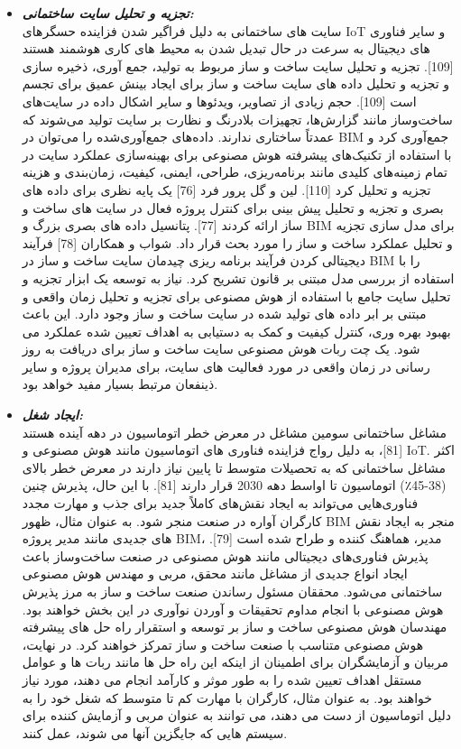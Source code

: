 \documentclass[towcolumn, 11pt]{Article}
\begin{document}
\begin{چکیده}
\begin{itemize}
\item
\textbf{\emph{تجزیه و تحلیل سایت ساختمانی:}}
\\سایت های ساختمانی به دلیل فراگیر شدن فزاینده حسگرهای IoT و سایر فناوری های دیجیتال به سرعت در حال تبدیل شدن به محیط های کاری هوشمند هستند [109]. تجزیه و تحلیل سایت ساخت و ساز مربوط به تولید، جمع آوری، ذخیره سازی و تجزیه و تحلیل داده های سایت ساخت و ساز برای ایجاد بینش عمیق برای تجسم است [109]. حجم زیادی از تصاویر، ویدئوها و سایر اشکال داده در سایت‌های ساخت‌وساز مانند گزارش‌ها، تجهیزات بلادرنگ و نظارت بر سایت تولید می‌شوند که عمدتاً ساختاری ندارند. داده‌های جمع‌آوری‌شده را می‌توان در BIM جمع‌آوری کرد و با استفاده از تکنیک‌های پیشرفته هوش مصنوعی برای بهینه‌سازی عملکرد سایت در تمام زمینه‌های کلیدی مانند برنامه‌ریزی، طراحی، ایمنی، کیفیت، زمان‌بندی و هزینه تجزیه و تحلیل کرد [110].
لین و گل پرور فرد [76] یک پایه نظری برای داده های بصری و تجزیه و تحلیل پیش بینی برای کنترل پروژه فعال در سایت های ساخت و ساز ارائه کردند [77]. پتانسیل داده های بصری بزرگ و BIM برای مدل سازی تجزیه و تحلیل عملکرد ساخت و ساز را مورد بحث قرار داد. شواب و همکاران [78] فرآیند دیجیتالی کردن فرآیند برنامه ریزی چیدمان سایت ساخت و ساز در BIM را با استفاده از بررسی مدل مبتنی بر قانون تشریح کرد. نیاز به توسعه یک ابزار تجزیه و تحلیل سایت جامع با استفاده از هوش مصنوعی برای تجزیه و تحلیل زمان واقعی و مبتنی بر ابر داده های تولید شده در سایت ساخت و ساز وجود دارد. این باعث بهبود بهره وری، کنترل کیفیت و کمک به دستیابی به اهداف تعیین شده عملکرد می شود. یک چت ربات هوش مصنوعی سایت ساخت و ساز برای دریافت به روز رسانی در زمان واقعی در مورد فعالیت های سایت، برای مدیران پروژه و سایر ذینفعان مرتبط بسیار مفید خواهد بود.

\item
\textbf{\emph{ایجاد شغل:}}
\\مشاغل ساختمانی سومین مشاغل در معرض خطر اتوماسیون در دهه آینده هستند [81]، به دلیل رواج فزاینده فناوری های اتوماسیون مانند هوش مصنوعی و IoT. اکثر مشاغل ساختمانی که به تحصیلات متوسط تا پایین نیاز دارند در معرض خطر بالای (38-45٪) اتوماسیون تا اواسط دهه 2030 قرار دارند [81]. با این حال، پذیرش چنین فناوری‌هایی می‌تواند به ایجاد نقش‌های کاملاً جدید برای جذب و مهارت مجدد کارگران آواره در صنعت منجر شود. به عنوان مثال، ظهور BIM منجر به ایجاد نقش های جدیدی مانند مدیر پروژه BIM، مدیر، هماهنگ کننده و طراح شده است [79]. پذیرش فناوری‌های دیجیتالی مانند هوش مصنوعی در صنعت ساخت‌وساز باعث ایجاد انواع جدیدی از مشاغل مانند محقق، مربی و مهندس هوش مصنوعی ساختمانی می‌شود. محققان مسئول رساندن صنعت ساخت و ساز به مرز پذیرش هوش مصنوعی با انجام مداوم تحقیقات و آوردن نوآوری در این بخش خواهند بود. مهندسان هوش مصنوعی ساخت و ساز بر توسعه و استقرار راه حل های پیشرفته هوش مصنوعی متناسب با صنعت ساخت و ساز تمرکز خواهند کرد. در نهایت، مربیان و آزمایشگران برای اطمینان از اینکه این راه حل ها مانند ربات ها و عوامل مستقل اهداف تعیین شده را به طور موثر و کارآمد انجام می دهند، مورد نیاز خواهند بود. به عنوان مثال، کارگران با مهارت کم تا متوسط که شغل خود را به دلیل اتوماسیون از دست می دهند، می توانند به عنوان مربی و آزمایش کننده برای سیستم هایی که جایگزین آنها می شوند، عمل کنند.


\end{itemize}
\end{چکیده}
\end{document}

